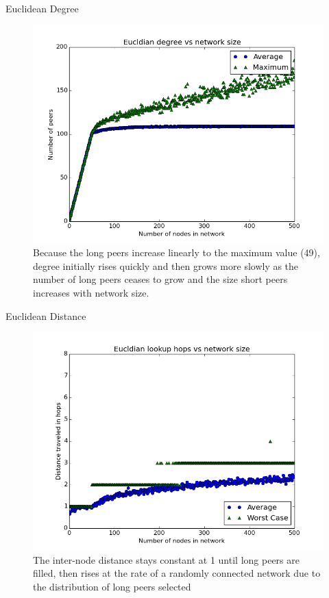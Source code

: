 \documentclass[11pt]{beamer}
\begin{document}
\begin{frame}{Euclidean Degree}

\begin{figure}
	\centering
	\includegraphics[width=0.7\linewidth]{figs/EucldianDegree}
	\caption[Growth of UrDHT degree]{Because the long peers increase linearly to the maximum value (49), degree initially rises quickly and then grows  more slowly as the number of long peers ceases to grow and the size short peers increases with network size. }
	\label{fig:EucldianDegree}
\end{figure}
\end{frame}

\begin{frame}{Euclidean Distance}
	\begin{figure}
		\centering
		\includegraphics[width=0.7\linewidth]{figs/EucldianDistance}
		\caption[Hops in Euclidean UrDHT]{The inter-node distance stays constant at 1 until long peers are filled, then rises at the rate of a randomly connected network due to the distribution of long peers selected}
		\label{fig:EucldianDistance}
	\end{figure}
\end{frame}
	
\end{document}
